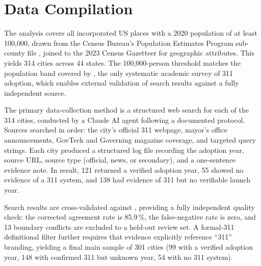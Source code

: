 \section{Data Compilation}

The analysis covers all incorporated US places with a 2020 population of at least
100{,}000, drawn from the Census Bureau's Population Estimates Program sub-county
file \citep{census_pep2023}, joined to the 2023
Census Gazetteer \citep{census_gaz2023} for geographic attributes.
This yields 314 cities across 44 states.
The 100{,}000-person threshold matches the population band covered by
\citet{obyrne2015}, the only systematic academic survey of 311 adoption, which
enables external validation of search results against a fully independent source.

The primary data-collection method is a structured web search for each of the 314
cities, conducted by a Claude AI agent following a documented protocol.
Sources searched in order: the city's official 311 webpage, mayor's office
announcements, GovTech and Governing magazine coverage, and targeted query strings.
Each city produced a structured log file recording the adoption year, source URL,
source type (official, news, or secondary), and a one-sentence evidence note.
In result, 121 returned a verified adoption year, 55 showed no evidence of
a 311 system, and 138 had evidence of 311 but no verifiable launch year.

Search results are cross-validated against \citet{obyrne2015}, providing a fully
independent quality check: the corrected agreement rate is 85.9\,\%, the
false-negative rate is zero, and 13 boundary conflicts are excluded to a held-out
review set.
A formal-311 definitional filter further requires that evidence explicitly reference
``311'' branding, yielding a final main sample of 301 cities (99 with a verified
adoption year, 148 with confirmed 311 but unknown year, 54 with no 311 system).
